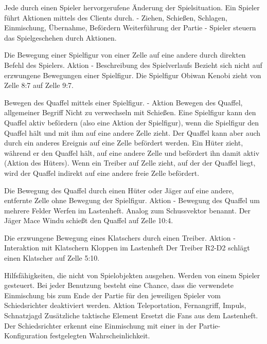 {Jede durch einen Spieler hervorgerufene Änderung der Spielsituation. Ein Spieler führt Aktionen mittels des Clients durch.}
{-}
{Ziehen, Schießen, Schlagen, Einmischung, Übernahme, Befördern}
{Weiterführung der Partie}
{-}
{Spieler steuern das Spielgeschehen durch Aktionen.}

{Die Bewegung einer Spielfigur von einer Zelle auf eine andere durch direkten Befehl des Spielers.}
{Aktion}
{-}
{Beschreibung des Spielverlaufs}
{Bezieht sich nicht auf erzwungene Bewegungen einer Spielfigur.}
{Die Spielfigur \glqq{}Obiwan Kenobi\grqq{} zieht von Zelle 8:7 auf Zelle 9:7.}

{Bewegen des Quaffel mittels einer Spielfigur.}
{-}
{Aktion}
{Bewegen des Quaffel, allgemeiner Begriff}
{Nicht zu verwechseln mit Schießen. Eine Spielfigur kann den Quaffel aktiv befördern (also eine Aktion der Spielfigur), wenn die Spielfigur den Quaffel hält und mit ihm auf eine andere Zelle zieht. Der Quaffel kann aber auch durch ein anderes Ereignis auf eine Zelle befördert werden.}
{Ein Hüter zieht, während er den Quaffel hält, auf eine andere Zelle und befördert ihn damit aktiv (Aktion des Hüters). Wenn ein Treiber auf Zelle zieht, auf der der Quaffel liegt, wird der Quaffel indirekt auf eine andere freie Zelle befördert.}

{Die Bewegung des Quaffel durch einen Hüter oder Jäger auf eine andere, entfernte Zelle ohne Bewegung der Spielfigur.}
{Aktion}
{-}
{Bewegung des Quaffel um mehrere Felder}
{\glqq{}Werfen\grqq{}  im Lastenheft. Analog zum Schussvektor benannt.}
{Der Jäger \glqq{}Mace Windu\grqq{} schießt den Quaffel auf Zelle 10:4.}

{Die erzwungene Bewegung eines Klatschers durch einen Treiber.}
{Aktion}
{-}
{Interaktion mit Klatschern}
{\glqq{}Kloppen\grqq{}  im Lastenheft}
{Der Treiber \glqq{}R2-D2\grqq{} schlägt einen Klatscher auf Zelle 5:10.}

{Hilfsfähigkeiten, die nicht von Spielobjekten ausgehen. Werden von einem Spieler gesteuert. Bei jeder Benutzung besteht eine Chance, dass die verwendete Einmischung bis zum Ende der Partie für den jeweiligen Spieler vom Schiedsrichter deaktiviert werden.}
{Aktion}
{Teleportation, Fernangriff, Impuls, Schnatzjagd}
{Zusätzliche taktische Element}
{Ersetzt die \glqq{}Fans\grqq{}  aus dem Lastenheft.}
{Der Schiedsrichter erkennt eine Einmischung mit einer in der Partie-Konfiguration festgelegten Wahrscheinlichkeit.}

